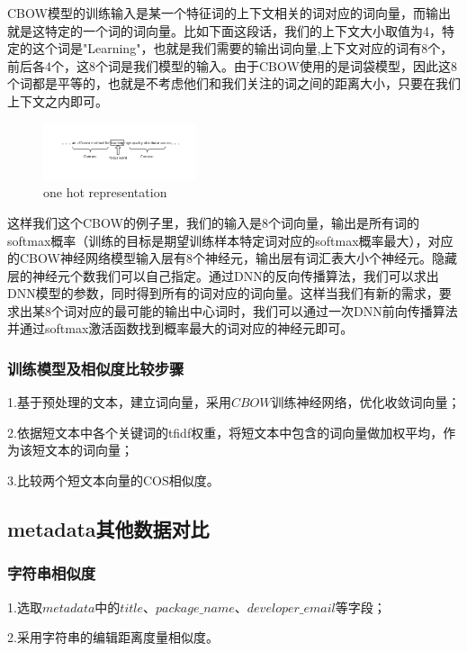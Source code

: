 \documentclass[UTF8,a4paper,10pt, twocolumn]{ctexart}
\begin{document}
CBOW模型的训练输入是某一个特征词的上下文相关的词对应的词向量，而输出就是这特定的一个词的词向量。比如下面这段话，我们的上下文大小取值为4，特定的这个词是"Learning"，也就是我们需要的输出词向量,上下文对应的词有8个，前后各4个，这8个词是我们模型的输入。由于CBOW使用的是词袋模型，因此这8个词都是平等的，也就是不考虑他们和我们关注的词之间的距离大小，只要在我们上下文之内即可。

\begin{figure}[htbp]
  \centering
  \includegraphics[width=0.4\textwidth]{img/fig10.png}
  \caption{one hot representation}
  \label{figure:zju8}
  \end{figure}

这样我们这个CBOW的例子里，我们的输入是8个词向量，输出是所有词的softmax概率（训练的目标是期望训练样本特定词对应的softmax概率最大），对应的CBOW神经网络模型输入层有8个神经元，输出层有词汇表大小个神经元。隐藏层的神经元个数我们可以自己指定。通过DNN的反向传播算法，我们可以求出DNN模型的参数，同时得到所有的词对应的词向量。这样当我们有新的需求，要求出某8个词对应的最可能的输出中心词时，我们可以通过一次DNN前向传播算法并通过softmax激活函数找到概率最大的词对应的神经元即可。


\subsubsection{训练模型及相似度比较步骤}
1.基于预处理的文本，建立词向量，采用$CBOW$训练神经网络，优化收敛词向量；

2.依据短文本中各个关键词的tfidf权重，将短文本中包含的词向量做加权平均，作为该短文本的词向量；

3.比较两个短文本向量的COS相似度。

\subsection{metadata其他数据对比}
\subsubsection{字符串相似度}
1.选取$metadata$中的$title$、$package\_name$、$developer\_email$等字段；

2.采用字符串的编辑距离度量相似度。
\end{document}
